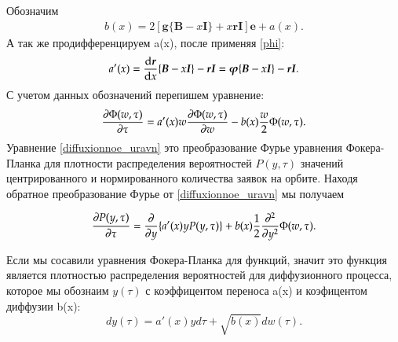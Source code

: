 Обозначим 
\begin{align}
	b(x)=2[\boldsymbol{g}\{\boldsymbol{B}-x\boldsymbol{I}\}+x\boldsymbol{rI}]\boldsymbol{e}+ a(x).
\end{align}
А так же продифференцируем a(x), после применяя \eqref{phi}:
\begin{align}
	a'(x)=\dv{\boldsymbol{r}}{x}\{\boldsymbol{B}-x\boldsymbol{I}\}-\boldsymbol{rI}=\boldsymbol{\varphi}\{\boldsymbol{B}-x\boldsymbol{I}\}-\boldsymbol{rI}.
\end{align}
С учетом данных обозначений перепишем уравнение:
\begin{align} \label{diffuxionnoe_uravn}
	\pdv{\Phi (w, \tau)}{\tau} =a'(x)w\pdv{\Phi (w, \tau)}{w}-b(x) \frac{w}{2}\Phi (w, \tau).
\end{align}
Уравнение \eqref{diffuxionnoe_uravn} это преобразование Фурье уравнения Фокера-Планка для плотности распределения вероятностей $P(y, \tau)$ 
значений центрированного и нормированного количества заявок на орбите. Находя обратное преобразование Фурье от \eqref{diffuxionnoe_uravn} мы получаем

\begin{align} \label{diffuxionnoe_uravn}
	\pdv{P (y, \tau)}{\tau} =\pdv{}{y}\{a'(x)yP (y, \tau)\}+b(x) \frac{1}{2}\frac{\partial^2}{\partial y^2}\Phi (w, \tau).
\end{align}

Если мы сосавили уравнения Фокера-Планка для функций, значит это функция является плотностью распределения вероятностей для диффузионного процесса, которое мы обознаим $y(\tau)$ с коэффицентом переноса a(x) и коэфицентом диффузии b(x):
\[dy(\tau)=a'(x)yd\tau +\sqrt{b(x)}dw(\tau).\]







